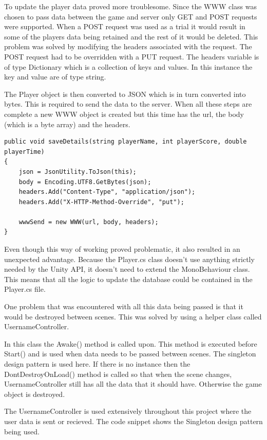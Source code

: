 \documentclass[12pt]{article}
\begin{document}
To update the player data proved more troublesome. Since the WWW class was chosen to pass data between the game and server only GET and POST requests were supported. When a POST request was used as a trial it would result in some of the players data being retained and the rest of it would be deleted. This problem was solved by modifying the headers associated with the request. The POST request had to be overridden with a PUT request. The headers variable is of type Dictionary which is a collection of keys and values. In this instance the key and value are of type string. 

The Player object is then converted to JSON which is in turn converted into bytes. This is required to send the data to the server. When all these steps are complete a new WWW object is created but this time has the url, the body (which is a byte array) and the headers.

\begin{lstlisting}
public void saveDetails(string playerName, int playerScore, double playerTime)
{
	json = JsonUtility.ToJson(this);
	body = Encoding.UTF8.GetBytes(json);
	headers.Add("Content-Type", "application/json");
	headers.Add("X-HTTP-Method-Override", "put");
	
	wwwSend = new WWW(url, body, headers);
}
\end{lstlisting}

Even though this way of working proved problematic, it also resulted in an unexpected advantage. Because the Player.cs class doesn't use anything strictly needed by the Unity API, it doesn't need to extend the MonoBehaviour class. This means that all the logic to update the database could be contained in the Player.cs file. 

One problem that was encountered with all this data being passed is that it would be destroyed between scenes. This was solved by using a helper class called UsernameController. 

In this class the Awake() method is called upon. This method is executed before Start() and is used when data needs to be passed between scenes. The singleton design pattern is used here. If there is no instance then the DontDestroyOnLoad() method is called so that when the scene changes, UsernameController still has all the data that it should have. Otherwise the game object is destroyed. 

The UsernameController is used extensively throughout this project where the user data is sent or recieved. The code snippet shows the Singleton design pattern being used. 
\end{document}
